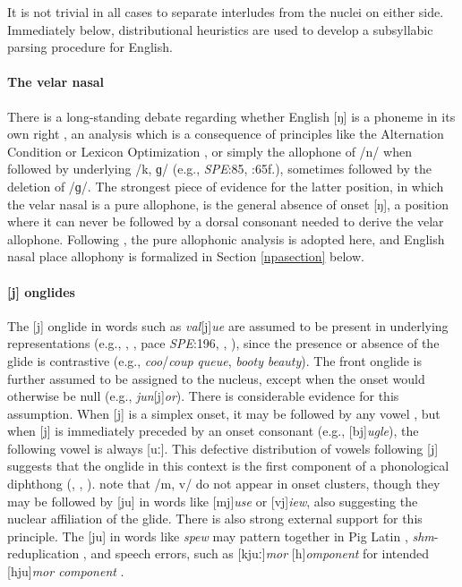 It is not trivial in all cases to separate interludes from the nuclei on either side. Immediately below, distributional heuristics are used to develop a subsyllabic parsing procedure for English.

\paragraph{The velar nasal} There is a long-standing debate regarding whether English [ŋ] is a phoneme in its own right \citep[e.g.,][]{Sapir1925}, an analysis which is a consequence of principles like the Alternation Condition \citep{Kiparsky1968} or Lexicon Optimization \citep[][53]{OT}, or simply the allophone of /n/ when followed by underlying /k, ɡ/ (e.g., \emph{SPE}:85, \citealt{Borowsky1986}:65f.), sometimes followed by the deletion of /ɡ/. The strongest piece of evidence for the latter position, in which the velar nasal is a pure allophone, is the general absence of onset [ŋ], a position where it can never be followed by a dorsal consonant needed to derive the velar allophone. Following \citet{Pierrehumbert1994}, the pure allophonic analysis is adopted here, and English nasal place allophony is formalized in Section \ref{npasection} below.

\paragraph{[j] onglides} The [j] onglide in words such as \emph{val}[j]\emph{ue} are assumed to be present in underlying representations (e.g., \citealt[][278]{Borowsky1986}, \citealt{Anderson1988b}, pace \emph{SPE}:196, \citealt[][89]{Halle1985a}, \citealt[][217]{McMahon1990}), since the presence or absence of the glide is contrastive (e.g., \emph{coo}/\emph{coup} \alt{} \emph{queue}, \emph{booty} \alt{} \emph{beauty}). The front onglide is further assumed to be assigned to the nucleus, except when the onset would otherwise be null (e.g., \emph{jun}[j]\emph{or}). There is considerable evidence for this assumption. When [j] is a simplex onset, it may be followed by any vowel \citep[][276]{Borowsky1986}, but when [j] is immediately preceded by an onset consonant (e.g., [bj]\emph{ugle}), the following vowel is always [uː]. 
This defective distribution of vowels following [j] suggests that the onglide in this context is the first component of a phonological diphthong (\citealp[][232]{Hayes1980}, \citealp[][61f.]{Harris1994}, \citealp{Davis1995}). \citet[][42]{Clements1983} note that /m, v/ do not appear in onset clusters, though they may be followed by [ju] in words like [mj]\emph{use} or [vj]\emph{iew}, also suggesting the nuclear affiliation of the glide. There is also strong external support for this principle. The [ju] in words like \emph{spew} may pattern together in Pig Latin \citep{Davis1995,Idsardi2005}, \emph{shm}-reduplication \citep{Nevins2003}, and speech errors, such as [kjuː]\emph{mor} [h]\emph{omponent} for intended [hju]\emph{mor component} \citep[][130]{Shattuck-Hufnagel1986}.

